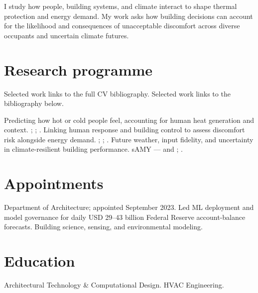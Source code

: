 \cvheader

I study how people, building systems, and climate interact to shape thermal protection and
energy demand. My work asks how building decisions can account for the likelihood and consequences
of unacceptable discomfort across diverse occupants and uncertain climate futures.

\section{Research programme}
\label{sec:research-programme}
{\fontsize{9}{11}\selectfont\color{muted}%
\ifdefined\cvShortProfile
  Selected work links to the full CV bibliography.
\else
  Selected work links to the bibliography below.
\fi\par}
  {Predicting how hot or cold people feel, accounting for human heat generation and context.}
  {; ;
   .}
  {Linking human response and building control to assess discomfort risk alongside energy demand.}
  {; ;
   .}
  {Future weather, input fidelity, and uncertainty in climate-resilient building performance.}
  {sAMY ---  and ;
   .}

\section{Appointments}
  {Department of Architecture; appointed September 2023.}
  {Led ML deployment and model governance for daily USD 29--43 billion Federal Reserve account-balance forecasts.}
  {Building science, sensing, and environmental modeling.}

\section{Education}
  {Architectural Technology \& Computational Design.}
  {HVAC Engineering.}

